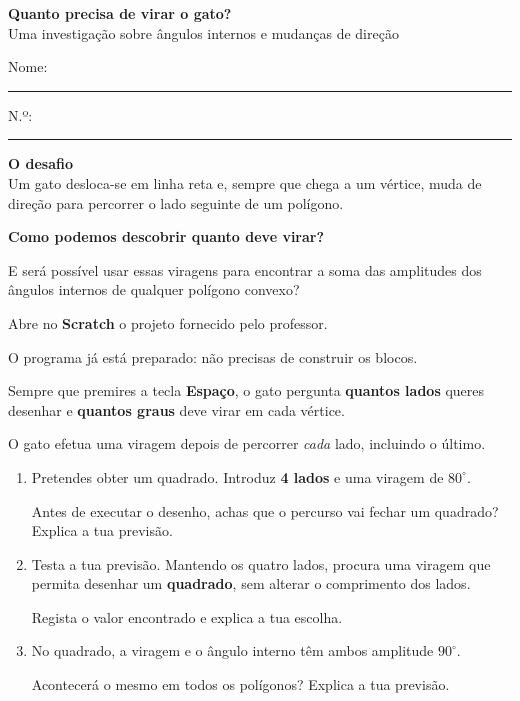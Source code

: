 \begin{center}
{\LARGE\bfseries\color{azul}
Quanto precisa de virar o gato?}\\[4pt]
{\normalsize Uma investigação sobre ângulos
internos e mudanças de direção}
\end{center}

\noindent
Nome: \rule{9cm}{.4pt}
\hfill
N.º: \rule{2cm}{.4pt}

\begin{desafio}
\textbf{O desafio}\\[3pt]

Um gato desloca-se em linha reta e,
sempre que chega a um vértice,
muda de direção para percorrer
o lado seguinte de um polígono.

\textbf{Como podemos descobrir quanto deve virar?}

E será possível usar essas viragens
para encontrar a soma das amplitudes
dos ângulos internos de qualquer
polígono convexo?

\end{desafio}



Abre no \textbf{Scratch} o projeto
fornecido pelo professor.

O programa já está preparado:
não precisas de construir os blocos.

Sempre que premires a tecla
\textbf{Espaço}, o gato pergunta
\textbf{quantos lados} queres desenhar
e \textbf{quantos graus} deve virar
em cada vértice.

O gato efetua uma viragem depois
de percorrer \emph{cada} lado,
incluindo o último.

\begin{enumerate}[label=\textbf{1.\arabic*.}]

\item
Pretendes obter um quadrado.
Introduz \textbf{4 lados} e uma
viragem de \textbf{$80^\circ$}.

Antes de executar o desenho,
achas que o percurso vai fechar
um quadrado?
Explica a tua previsão.


\item
Testa a tua previsão.
Mantendo os quatro lados, procura
uma viragem que permita desenhar
um \textbf{quadrado}, sem alterar
o comprimento dos lados.

Regista o valor encontrado
e explica a tua escolha.


\item
No quadrado, a viragem e o
ângulo interno têm ambos
amplitude $90^\circ$.

Acontecerá o mesmo em todos
os polígonos?
Explica a tua previsão.


\end{enumerate}

